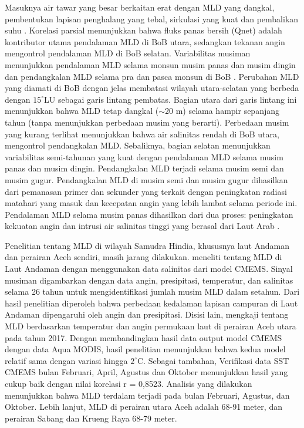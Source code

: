 \begin{spacing}{1.5}
	Masuknya air tawar yang besar berkaitan erat dengan MLD yang dangkal, pembentukan lapisan penghalang yang tebal, sirkulasi yang kuat dan pembalikan suhu . Korelasi parsial menunjukkan bahwa fluks panas bersih (Qnet) adalah kontributor utama pendalaman MLD di BoB utara, sedangkan tekanan angin mengontrol pendalaman MLD di BoB selatan. Variabilitas musiman menunjukkan pendalaman MLD selama monsun musim panas dan musim dingin dan pendangkalan MLD selama pra dan pasca monsun di BoB . Perubahan MLD yang diamati di BoB dengan jelas membatasi wilayah utara-selatan yang berbeda dengan $15^\circ$LU sebagai garis lintang pembatas. Bagian utara dari garis lintang ini menunjukkan bahwa MLD tetap dangkal ($\sim$20 m) selama hampir sepanjang tahun (tanpa menunjukkan perbedaan musim yang berarti). Perbedaan musim yang kurang terlihat menunjukkan bahwa air salinitas rendah di BoB utara, mengontrol pendangkalan MLD. Sebaliknya, bagian selatan menunjukkan variabilitas semi-tahunan yang kuat dengan pendalaman MLD selama musim panas dan musim dingin. Pendangkalan MLD terjadi selama musim semi dan musim gugur. Pendangkalan MLD di musim semi dan musim gugur dihasilkan dari pemanasan primer dan sekunder yang terkait dengan peningkatan radiasi matahari yang masuk dan kecepatan angin yang lebih lambat selama periode ini. Pendalaman MLD selama musim panas dihasilkan dari dua proses: peningkatan kekuatan angin dan intrusi air salinitas tinggi yang berasal dari Laut Arab .
	
	Penelitian tentang MLD di wilayah Samudra Hindia, khususnya laut Andaman dan perairan Aceh sendiri, masih jarang dilakukan.  meneliti tentang MLD di Laut Andaman dengan menggunakan data salinitas dari model CMEMS. Sinyal musiman digambarkan dengan data angin, presipitasi, temperatur, dan salinitas selama 26 tahun untuk mengidentifikasi jumlah musim MLD dalam setahun. Dari hasil penelitian diperoleh bahwa perbedaan kedalaman lapisan campuran di Laut Andaman dipengaruhi oleh angin dan presipitasi. Disisi lain,  mengkaji tentang MLD berdasarkan temperatur dan angin permukaan laut di perairan Aceh utara pada tahun 2017. Dengan membandingkan hasil data output model CMEMS dengan data Aqua MODIS, hasil penelitian menunjukkan bahwa kedua model relatif sama dengan variasi hingga $2^\circ$C. Sebagai tambahan, Verifikasi data SST CMEMS bulan Februari, April, Agustus dan Oktober menunjukkan hasil yang cukup baik dengan nilai korelasi r = 0,8523. Analisis yang dilakukan menunjukkan bahwa MLD terdalam terjadi pada bulan Februari, Agustus, dan Oktober. Lebih lanjut, MLD di perairan utara Aceh adalah 68-91 meter, dan perairan Sabang dan Krueng Raya 68-79 meter. 
	

\end{spacing}
